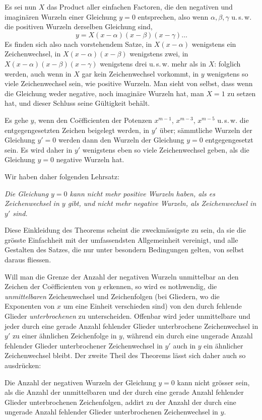 Es sei nun $X$ das Product aller einfachen Factoren, die den negativen
und imaginären Wurzeln einer Gleichung $y=0$ entsprechen, also wenn
$\alpha,\beta,\gamma$ u.\,s.\,w. die positiven Wurzeln derselben
Gleichung sind,
\[
y=X(x-\alpha)(x-\beta)(x-\gamma)\ldots
\]
Es finden sich also nach vorstehendem Satze, in $X(x-\alpha)$
wenigstens ein Zeichenwechsel, in $X(x-\alpha)(x-\beta)$ wenigstens
zwei, in $X(x-\alpha)(x-\beta)(x-\gamma)$ wenigstens drei u.\,s.\,w.
mehr als in $X$: folglich werden, auch wenn in $X$ gar kein
Zeichenwechsel vorkommt, in $y$ wenigstens so viele Zeichenwechsel
sein, wie positive Wurzeln. Man sieht von selbst, dass wenn die
Gleichung weder negative, noch imaginäre Wurzeln hat, man $X=1$ zu
setzen hat, und dieser Schluss seine Gültigkeit behält.

Es gehe $y$, wenn den Coëfficienten der Potenzen $x^{m-1}$,
$x^{m-3}$, $x^{m-5}$ u.\,s.\,w. die entgegengesetzten Zeichen
beigelegt werden, in $y'$ über; sämmtliche Wurzeln der Gleichung
$y'=0$ werden dann den Wurzeln der Gleichung $y=0$ entgegengesetzt
sein. Es wird daher in $y'$ wenigstens eben so viele Zeichenwechsel
geben, als die Gleichung $y=0$ negative Wurzeln hat.
\par
{}
Wir haben daher folgenden Lehrsatz:

\emph{Die Gleichung $y=0$ kann nicht mehr positive Wurzeln haben,
als es Zeichenwechsel in $y$ gibt, und nicht mehr negative Wurzeln,
als Zeichenwechsel in $y'$ sind.}

Diese Einkleidung des Theorems scheint die zweckmässigste zu sein, da
sie die grösste Einfachheit mit der umfassendsten Allgemeinheit
vereinigt, und alle Gestalten des Satzes, die nur unter besondern
Bedingungen gelten, von selbst daraus fliessen.

Will man die Grenze der Anzahl der negativen Wurzeln unmittelbar an
den Zeichen der Coëfficienten von $y$ erkennen, so wird es nothwendig,
die \emph{unmittelbaren} Zeichenwechsel und Zeichenfolgen (bei
Gliedern, wo die Exponenten von $x$ um eine Einheit verschieden sind)
von den durch fehlende Glieder \emph{unterbrochenen} zu unterscheiden.
Offenbar wird jeder unmittelbare und jeder durch eine gerade Anzahl
fehlender Glieder unterbrochene Zeichenwechsel in $y'$ zu einer
ähnlichen Zeichenfolge in $y$, während ein durch eine ungerade Anzahl
fehlender Glieder unterbrochener Zeichenwechsel in $y'$ auch in $y$
ein ähnlicher Zeichenwechsel bleibt. Der zweite Theil des Theorems
lässt sich daher auch so ausdrücken:

Die Anzahl der negativen Wurzeln der Gleichung $y=0$ kann nicht
grösser sein, als die Anzahl der unmittelbaren und der durch eine
gerade Anzahl fehlender Glieder unterbrochenen Zeichenfolgen, addirt
zu der Anzahl der durch eine ungerade Anzahl fehlender Glieder
unterbrochenen Zeichenwechsel in $y$.

